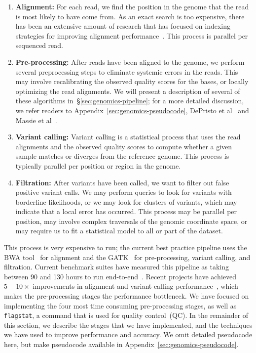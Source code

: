 \documentclass{acm_proc_article-sp}
\begin{document}
\begin{enumerate}
\item \textbf{Alignment:} For each read, we find the position in the genome that the read is most likely to
have come from. As an exact search is too expensive, there has been an extensive amount of research
that has focused on indexing strategies for improving alignment performance~\cite{li10, li11,
zaharia11}. This process is parallel per sequenced read.
\item \textbf{Pre-processing:} After reads have been aligned to the genome, we perform several
preprocessing steps to eliminate systemic errors in the reads. This may involve recalibrating the
observed quality scores for the bases, or locally optimizing the read alignments. We will present a
description of several of these algorithms in~\S\ref{sec:genomics-pipeline}; for a more detailed
discussion, we refer readers to Appendix~\ref{sec:genomics-pseudocode}, DePristo et
al~\cite{depristo11} and Massie et al~\cite{massie13}.
\item \textbf{Variant calling:} Variant calling is a statistical process that uses the read alignments
and the observed quality scores to compute whether a given sample \linebreak matches or diverges
from the reference genome. This process is typically parallel per position or region in the genome.
\item \textbf{Filtration:} After variants have been called, we want to filter out false positive variant calls.
We may perform queries to look for variants with borderline likelihoods, or we may look for clusters of
variants, which may indicate that a local error has occurred. This process may be parallel per position,
may involve complex traversals of the genomic coordinate space, or may require us to fit a statistical
model to all or part of the dataset.
\end{enumerate}

This process is very expensive to run; the current best practice pipeline uses the BWA tool~\cite{li10} for
alignment and the GATK~\cite{mckenna10, depristo11} for pre-processing, variant calling, and filtration.
Current benchmark suites have measured this pipeline as taking between 90 and 130 hours to run
end-to-end~\cite{talwalkar14}. Recent projects have achieved $5-10\times$ improvements in alignment
and variant calling performance~\cite{zaharia11, rimmer14}, which makes the pre-processing stages
the performance bottleneck. We have focused on implementing the four most time consuming
pre-processing stages, as well as \texttt{flagstat}, a command that is used for quality control~(QC). In
the remainder of this section, we describe the stages that we have implemented, and the techniques
we have used to improve performance and accuracy. We omit detailed pseudocode here, but make
pseudocode available in Appendix~\ref{sec:genomics-pseudocode}.
\end{document}
